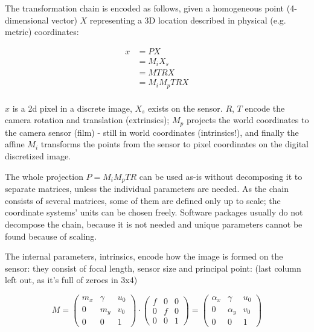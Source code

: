 
The transformation chain is encoded as follows, given a homogeneous point (4-dimensional vector) $X$ representing a 3D location described in physical (e.g. metric) coordinates:

\begin{align}
	x &= P X\\
	  &= M_i X_s\\ %
	  &= M T R X\\
	  &= M_i M_p T R X\\ %
\end{align}

$x$ is a 2d pixel in a discrete image, $X_s$ exists on the sensor. $R$, $T$ encode the camera rotation and translation (extrinsics); $M_p$ projects the world coordinates to the camera sensor (film) - still in world coordinates (intrinsics!), and finally the affine $M_i$ transforms the points from the sensor to pixel coordinates on the digital discretized image.

The whole projection $P = M_i M_p T R$ can be used as-is without decomposing it to separate matrices, unless the individual parameters are needed. As the chain consists of several matrices, some of them are defined only up to scale; the coordinate systems' units can be chosen freely. Software packages usually do not decompose the chain, because it is not needed and unique parameters cannot be found because of scaling.


The internal parameters, intrinsics, encode how the image is formed on the sensor: they consist of focal length, sensor size and principal point: (last column left out, as it's full of zeroes in 3x4)

\begin{equation}
	M =
	\begin{pmatrix}
		m_x & \gamma & u_0\\
		0   &    m_y & v_0\\
		0   &        0 & 1
	\end{pmatrix}
\cdot
	\begin{pmatrix}
		f & 0 & 0\\
		0 & f & 0\\
		0 & 0 & 1
	\end{pmatrix}
	=
	\begin{pmatrix}
		\alpha_x & \gamma   & u_0\\
		0        & \alpha_y & v_0\\
		0        & 0        & 1
	\end{pmatrix}
\end{equation}

